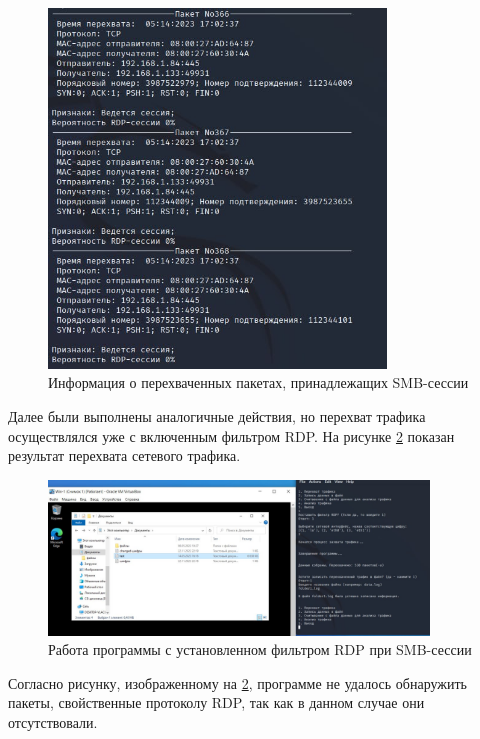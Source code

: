\documentclass[bachelor, och, coursework]{SCWorks}
\begin{document}
\begin{figure}[H]
  \centering
  \includegraphics[width=0.8\textwidth]{photo/smb2.jpg}
  \caption{Информация о перехваченных пакетах, принадлежащих SMB-сессии}
  \label{smb2}
\end{figure}

Далее были выполнены аналогичные действия, но перехват трафика осуществлялся уже с включенным фильтром RDP.
На рисунке \ref{smbfilter} показан результат перехвата сетевого трафика.

\begin{figure}[H]
  \centering
  \includegraphics[width=0.9\textwidth]{photo/smb-filter.jpg}
  \caption{Работа программы с установленном фильтром RDP при SMB-сессии}
  \label{smbfilter}
\end{figure}

Согласно рисунку, изображенному на \ref{smbfilter}, программе не удалось обнаружить пакеты, свойственные протоколу RDP, 
так как в данном случае они отсутствовали.   
\end{document}
